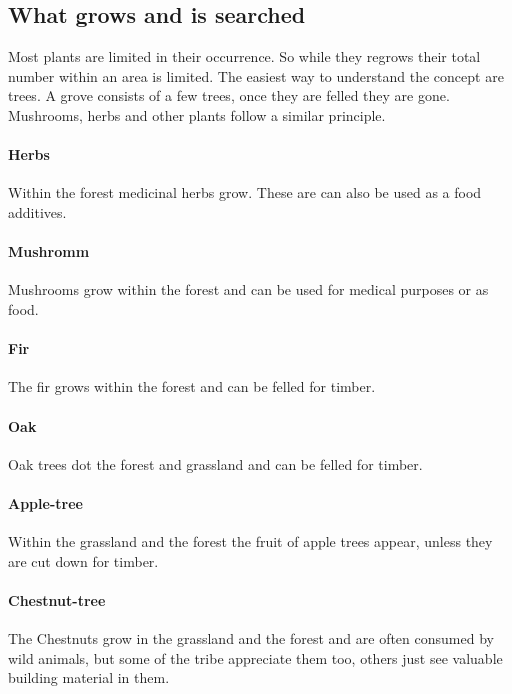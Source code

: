 \subsection{What grows and is searched}\label{ch:Goods:Nature:Plants:Limited}

Most plants are limited in their occurrence. So while they regrows their total
number within an area is limited. The easiest way to understand the concept are
trees. A grove consists of a few trees, once they are felled they are gone.
Mushrooms, herbs and other plants follow a similar principle.

\paragraph{Herbs}

Within the forest medicinal herbs grow. These are can also be used as a food
additives.

\paragraph{Mushromm}

Mushrooms grow within the forest and can be used for medical purposes or as
food.

\paragraph{Fir}

The fir grows within the forest and can be felled for timber.

\paragraph{Oak}

Oak trees dot the forest and grassland and can be felled for timber.

\paragraph{Apple-tree}

Within the grassland and the forest the fruit of apple trees appear, unless
they are cut down for timber.

\paragraph{Chestnut-tree}

The Chestnuts grow in the grassland and the forest and are often consumed by
wild animals, but some of the tribe appreciate them too, others just see
valuable building material in them.